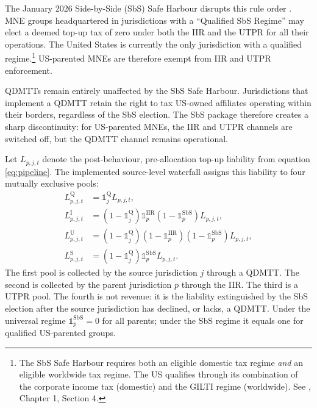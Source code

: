 \documentclass[11pt,a4paper]{article}
\begin{document}
The January 2026 Side-by-Side (SbS) Safe Harbour disrupts this rule order \citep{oecd2026}. MNE groups headquartered in jurisdictions with a ``Qualified SbS Regime'' may elect a deemed top-up tax of zero under both the IIR and the UTPR for all their operations. The United States is currently the only jurisdiction with a qualified regime.\footnote{The SbS Safe Harbour requires both an eligible domestic tax regime \emph{and} an eligible worldwide tax regime. The US qualifies through its combination of the corporate income tax (domestic) and the GILTI regime (worldwide). See \citet{oecd2026}, Chapter 1, Section 4.} US-parented MNEs are therefore exempt from IIR and UTPR enforcement.

QDMTTs remain entirely unaffected by the SbS Safe Harbour. Jurisdictions that implement a QDMTT retain the right to tax US-owned affiliates operating within their borders, regardless of the SbS election. The SbS package therefore creates a sharp discontinuity: for US-parented MNEs, the IIR and UTPR channels are switched off, but the QDMTT channel remains operational. 

Let $L_{p,j,t}$ denote the post-behaviour, pre-allocation top-up liability from equation \eqref{eq:pipeline}. The implemented source-level waterfall assigns this liability to four mutually exclusive pools:
\begin{align}
L_{p,j,t}^{\text{Q}} &= \mathbb{1}_j^{\text{Q}} L_{p,j,t}, \label{eq:qdmtt_sbs} \\
L_{p,j,t}^{\text{I}} &= (1-\mathbb{1}_j^{\text{Q}})\mathbb{1}_p^{\text{IIR}}(1-\mathbb{1}_p^{\text{SbS}})L_{p,j,t}, \label{eq:iir_sbs} \\
L_{p,j,t}^{\text{U}} &= (1-\mathbb{1}_j^{\text{Q}})(1-\mathbb{1}_p^{\text{IIR}})(1-\mathbb{1}_p^{\text{SbS}})L_{p,j,t}, \label{eq:utpr_sbs} \\
L_{p,j,t}^{\text{S}} &= (1-\mathbb{1}_j^{\text{Q}})\mathbb{1}_p^{\text{SbS}}L_{p,j,t}. \label{eq:sbs_extinguish}
\end{align}
The first pool is collected by the source jurisdiction $j$ through a QDMTT. The second is collected by the parent jurisdiction $p$ through the IIR. The third is a UTPR pool. The fourth is not revenue: it is the liability extinguished by the SbS election after the source jurisdiction has declined, or lacks, a QDMTT. Under the universal regime $\mathbb{1}_p^{\text{SbS}}=0$ for all parents; under the SbS regime it equals one for qualified US-parented groups.
\end{document}
